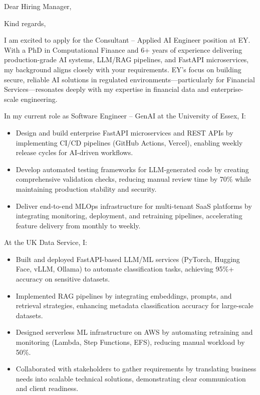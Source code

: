 \documentclass[10pt,a4paper,sans]{moderncv}
\begin{document}
\date{\today}
\opening{Dear Hiring Manager,}
\closing{Kind regards,}

\makelettertitle
\vspace{-0.5cm} %

I am excited to apply for the Consultant – Applied AI Engineer position at EY. With a PhD in Computational Finance and 6+ years of experience delivering production-grade AI systems, LLM/RAG pipelines, and FastAPI microservices, my background aligns closely with your requirements. EY’s focus on building secure, reliable AI solutions in regulated environments—particularly for Financial Services—resonates deeply with my expertise in financial data and enterprise-scale engineering.

In my current role as Software Engineer – GenAI at the University of Essex, I:
\begin{itemize}
    \item Design and build enterprise FastAPI microservices and REST APIs by implementing CI/CD pipelines (GitHub Actions, Vercel), enabling weekly release cycles for AI-driven workflows.
    \item Develop automated testing frameworks for LLM-generated code by creating comprehensive validation checks, reducing manual review time by 70\% while maintaining production stability and security.
    \item Deliver end-to-end MLOps infrastructure for multi-tenant SaaS platforms by integrating monitoring, deployment, and retraining pipelines, accelerating feature delivery from monthly to weekly.
\end{itemize}

At the UK Data Service, I:
\begin{itemize}
    \item Built and deployed FastAPI-based LLM/ML services (PyTorch, Hugging Face, vLLM, Ollama) to automate classification tasks, achieving 95\%+ accuracy on sensitive datasets.
    \item Implemented RAG pipelines by integrating embeddings, prompts, and retrieval strategies, enhancing metadata classification accuracy for large-scale datasets.
    \item Designed serverless ML infrastructure on AWS by automating retraining and monitoring (Lambda, Step Functions, EFS), reducing manual workload by 50\%.
    \item Collaborated with stakeholders to gather requirements by translating business needs into scalable technical solutions, demonstrating clear communication and client readiness.
\end{itemize}
\end{document}
